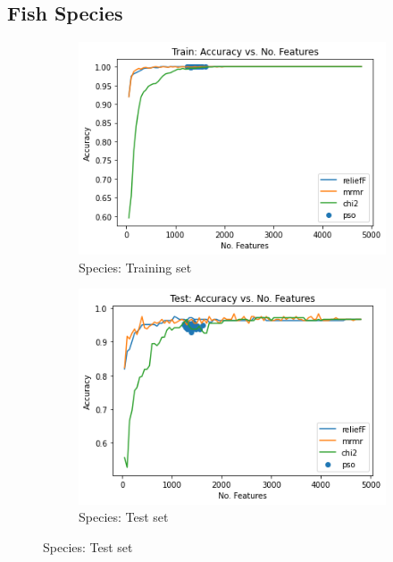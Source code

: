\documentclass[runningheads]{llncs}
\begin{document}

\subsection{Fish Species}

\begin{figure}[htb]
  \centering
  \caption[Two numerical solutions]{
      FS Classification Accuracy per $k$
    }
  \begin{subfigure}[b]{.55\linewidth}
    \includegraphics[width=\linewidth]{accuracy-features-fish-train.png}
    \caption{Species: Training set}\label{fig:accuracy-features-fish-train}
  \end{subfigure}
  \begin{subfigure}[b]{.55\linewidth}
    \includegraphics[width=\linewidth]{accuracy-features-fish-test.png}
    \caption{Species: Test set}\label{fig:accuracy-features-fish-test}
  \end{subfigure}
 
  \label{fig:animals}
\end{figure}
\end{document}
